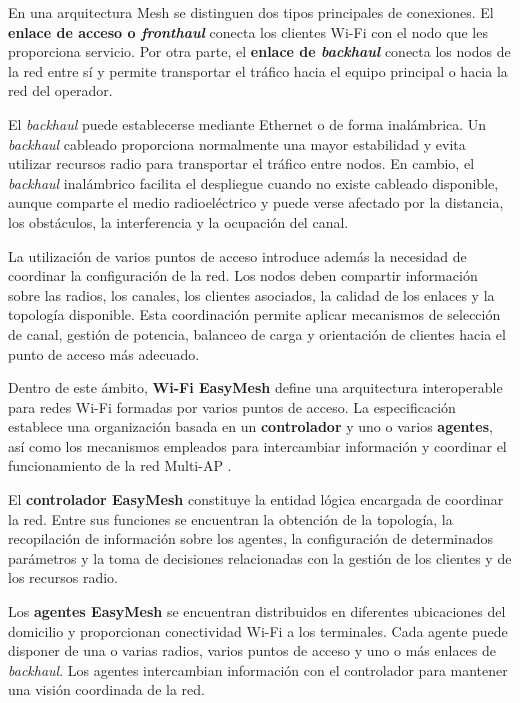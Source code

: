 En una arquitectura Mesh se distinguen dos tipos principales de
conexiones. El \textbf{enlace de acceso o \textit{fronthaul}} conecta los
clientes Wi-Fi con el nodo que les proporciona servicio. Por otra parte,
el \textbf{enlace de \textit{backhaul}} conecta los nodos de la red entre
sí y permite transportar el tráfico hacia el equipo principal o hacia la
red del operador.

El \textit{backhaul} puede establecerse mediante Ethernet o de forma
inalámbrica. Un \textit{backhaul} cableado proporciona normalmente una
mayor estabilidad y evita utilizar recursos radio para transportar el
tráfico entre nodos. En cambio, el \textit{backhaul} inalámbrico facilita
el despliegue cuando no existe cableado disponible, aunque comparte el
medio radioeléctrico y puede verse afectado por la distancia, los
obstáculos, la interferencia y la ocupación del canal.

La utilización de varios puntos de acceso introduce además la necesidad
de coordinar la configuración de la red. Los nodos deben compartir
información sobre las radios, los canales, los clientes asociados, la
calidad de los enlaces y la topología disponible. Esta coordinación
permite aplicar mecanismos de selección de canal, gestión de potencia,
balanceo de carga y orientación de clientes hacia el punto de acceso más
adecuado.

Dentro de este ámbito, \textbf{Wi-Fi EasyMesh} define una arquitectura
interoperable para redes Wi-Fi formadas por varios puntos de acceso. La
especificación establece una organización basada en un
\textbf{controlador} y uno o varios \textbf{agentes}, así como los
mecanismos empleados para intercambiar información y coordinar el
funcionamiento de la red Multi-AP
\cite{wifi_alliance_easymesh}.

El \textbf{controlador EasyMesh} constituye la entidad lógica encargada
de coordinar la red. Entre sus funciones se encuentran la obtención de la
topología, la recopilación de información sobre los agentes, la
configuración de determinados parámetros y la toma de decisiones
relacionadas con la gestión de los clientes y de los recursos radio.

Los \textbf{agentes EasyMesh} se encuentran distribuidos en diferentes
ubicaciones del domicilio y proporcionan conectividad Wi-Fi a los
terminales. Cada agente puede disponer de una o varias radios, varios
puntos de acceso y uno o más enlaces de \textit{backhaul}. Los agentes
intercambian información con el controlador para mantener una visión
coordinada de la red.

